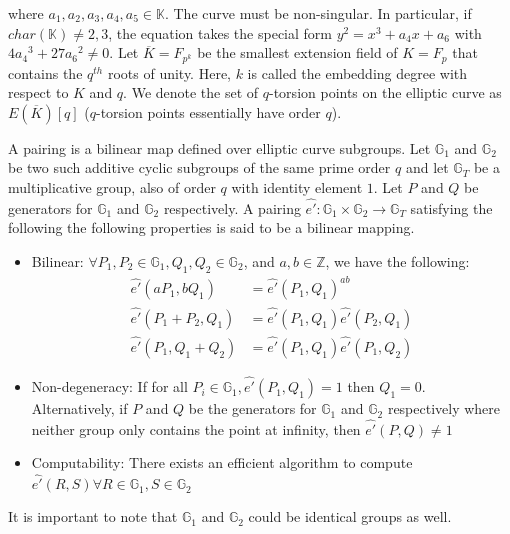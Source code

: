 where $a_1, a_2, a_3, a_4, a_5 \in \mathbb{K}$. The curve must be non-singular. In particular, if $char(\mathbb{K})\neq2,3$, the equation takes the special form $y^2=x^3+a_4x+a_6$ with $4{a_4}^3+27{a_6}^2\neq0$. Let $\overline{K} = F_{p^k}$ be the smallest extension field of $K=F_p$ that contains the $q^{th}$ roots of unity. Here, $k$ is called the embedding degree with respect to $K$ and $q$. We denote the set of $q$-torsion points on the elliptic curve as $E(\overline{K})[q]$ ($q$-torsion points essentially have order $q$).

A pairing is a bilinear map defined over elliptic curve subgroups. Let $\mathbb{G}_{1}$ and $\mathbb{G}_{2}$ be two such additive cyclic subgroups of the same prime order $q$ and let $\mathbb{G}_{T}$ be a multiplicative group, also of order $q$ with identity element $1$. Let $P$ and $Q$ be generators for $\mathbb{G}_1$ and $\mathbb{G}_2$ respectively. A pairing $\hat{e'}:\mathbb{G}_1 \times \mathbb{G}_2\longrightarrow\mathbb{G}_T$ satisfying the following the following properties is said to be a bilinear mapping. 

\begin{itemize}
 \item Bilinear: $\forall P_1,P_2 \in \mathbb{G}_1, Q_1,Q_2\in\mathbb{G}_2$, and $a,b \in \mathbb{Z}$, we have the following:
 \begin{eqnarray}
   \hat{e'}(aP_1,bQ_1) &= \hat{e'}(P_1,Q_1)^{ab}\nonumber\\
   \hat{e'}(P_1+P_2,Q_1) &= \hat{e'}(P_1,Q_1)\hat{e'}(P_2,Q_1)\nonumber\\
   \hat{e'}(P_1,Q_1+Q_2) &= \hat{e'}(P_1,Q_1)\hat{e'}(P_1,Q_2)\nonumber
 \end{eqnarray}
 \item Non-degeneracy: If for all $P_i \in \mathbb{G}_1, \hat{e'}(P_1,Q_1)=1$ then $Q_1=\mathcal{0}$. Alternatively, if $P$ and $Q$ be the generators for $\mathbb{G}_1$ and $\mathbb{G}_2$ respectively where neither group only contains the point at infinity, then $\hat{e'}(P,Q)\neq1$ 
 \item Computability: There exists an efficient algorithm to compute $\hat{e'}(R,S)\forall R \in \mathbb{G}_1, S\in\mathbb{G}_2$
\end{itemize}

It is important to note that $\mathbb{G}_1$ and $\mathbb{G}_2$ could be identical groups as well.


